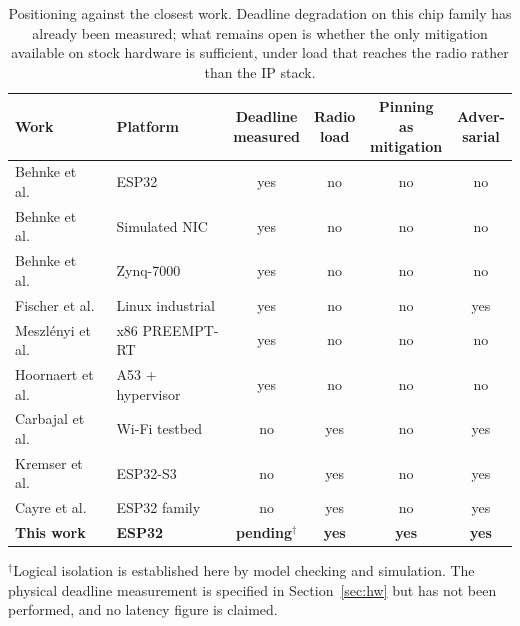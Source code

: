 \begin{table}[htbp]
\centering\small
\caption{Positioning against the closest work. Deadline degradation on this chip family has
already been measured; what remains open is whether the only mitigation available on stock
hardware is sufficient, under load that reaches the radio rather than the IP stack.}
\label{tab:position}
\begin{tabular}{@{}llcccc@{}}
\toprule
Work & Platform & \shortstack{Deadline\\measured} & \shortstack{Radio\\load}
     & \shortstack{Pinning as\\mitigation} & \shortstack{Adver-\\sarial} \\
\midrule
Behnke et al.~\cite{behnke2020}    & ESP32                & yes & no  & no  & no  \\
Behnke et al.~\cite{behnke2022}    & Simulated NIC        & yes & no  & no  & no  \\
Behnke et al.~\cite{behnke2023}    & Zynq-7000            & yes & no  & no  & no  \\
Fischer et al.~\cite{fischer2020}  & Linux industrial     & yes & no  & no  & yes \\
Meszl\'enyi et al.~\cite{timingiso2025} & x86 PREEMPT-RT  & yes & no  & no  & no  \\
Hoornaert et al.~\cite{mcti2024}   & A53 + hypervisor     & yes & no  & no  & no  \\
Carbajal et al.~\cite{carbajal2026}& Wi-Fi testbed        & no  & yes & no  & yes \\
Kremser et al.~\cite{deauther2026} & ESP32-S3             & no  & yes & no  & yes \\
Cayre et al.~\cite{espwn2023}      & ESP32 family         & no  & yes & no  & yes \\
\midrule
\textbf{This work}                 & \textbf{ESP32}       & \textbf{pending}$^{\dagger}$ & \textbf{yes} & \textbf{yes} & \textbf{yes} \\
\bottomrule
\end{tabular}

\vspace{0.4em}
{\footnotesize $^{\dagger}$Logical isolation is established here by model checking and
simulation. The physical deadline measurement is specified in Section~\ref{sec:hw} but has not
been performed, and no latency figure is claimed.}
\end{table}

